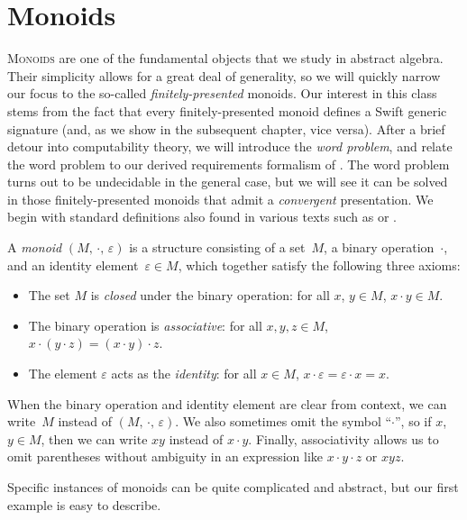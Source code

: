 \documentclass[../generics]{subfiles}
\begin{document}
\chapter{Monoids}\label{monoids}

\lettrine{M}{onoids} are one of the fundamental objects that we study in abstract algebra. Their simplicity allows for a great deal of generality, so we will quickly narrow our focus to the so-called \emph{finitely-presented} monoids. Our interest in this class stems from the fact that every finitely-presented monoid defines a Swift generic signature (and, as we show in the subsequent chapter, vice versa). After a brief detour into computability theory, we will introduce the \emph{word problem}, and relate the word problem to our derived requirements formalism of . The word problem turns out to be undecidable in the general case, but we will see it can be solved in those finitely-presented monoids that admit a \emph{convergent} presentation. We begin with standard definitions also found in various texts such as \cite{semigroup} or \cite{postmodern}.
\begin{definition}
A \emph{monoid} \index{$\cdot$}$(M,\, \cdot,\, \varepsilon)$ is a structure consisting of a set~$M$, a binary operation~$\cdot$, and an identity element~$\varepsilon\in M$, which together satisfy the following three axioms:
\begin{itemize}
\item The set $M$ is \emph{closed} under the binary operation: for all $x$, $y \in M$, $x\cdot y\in M$.
\item The binary operation is \emph{associative}: for all $x, y, z \in M$, $x\cdot(y\cdot z)=(x\cdot y)\cdot z$.
\item The element $\varepsilon$ acts as the \emph{identity}: for all $x\in M$, $x\cdot \varepsilon=\varepsilon\cdot x=x$.
\end{itemize}
When the binary operation and identity element are clear from context, we can write~$M$ instead of $(M,\,\cdot,\,\varepsilon)$. We also sometimes omit the symbol ``\;$\cdot$\;'', so if $x$, $y\in M$, then we can write $xy$ instead of $x\cdot y$. Finally, associativity allows us to omit parentheses without ambiguity in an expression like $x\cdot y\cdot z$ or $xyz$.

Specific instances of monoids can be quite complicated and abstract, but our first example is easy to describe.
\end{definition}
\end{document}
